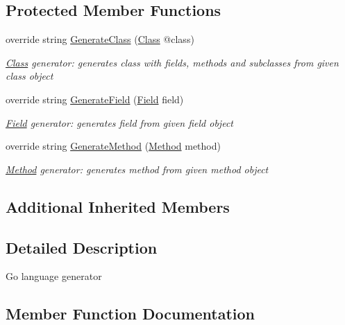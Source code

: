 \subsection*{Protected Member Functions}
\begin{DoxyCompactItemize}
\item 
override string \mbox{\hyperlink{classCodeGen_1_1generators_1_1GoGenerator_aacdb59f4942c999f06400f9f92732858}{Generate\+Class}} (\mbox{\hyperlink{classCodeGen_1_1generators_1_1Class}{Class}} @class)
\begin{DoxyCompactList}\small\item\em \mbox{\hyperlink{classCodeGen_1_1generators_1_1Class}{Class}} generator\+: generates class with fields, methods and subclasses from given class object  \end{DoxyCompactList}\item 
override string \mbox{\hyperlink{classCodeGen_1_1generators_1_1GoGenerator_aa7417b36b964e679a37dfee960148768}{Generate\+Field}} (\mbox{\hyperlink{classCodeGen_1_1generators_1_1Field}{Field}} field)
\begin{DoxyCompactList}\small\item\em \mbox{\hyperlink{classCodeGen_1_1generators_1_1Field}{Field}} generator\+: generates field from given field object  \end{DoxyCompactList}\item 
override string \mbox{\hyperlink{classCodeGen_1_1generators_1_1GoGenerator_ac732350d06454ed93f2053c0971c8fd9}{Generate\+Method}} (\mbox{\hyperlink{classCodeGen_1_1generators_1_1Method}{Method}} method)
\begin{DoxyCompactList}\small\item\em \mbox{\hyperlink{classCodeGen_1_1generators_1_1Method}{Method}} generator\+: generates method from given method object  \end{DoxyCompactList}\end{DoxyCompactItemize}
\subsection*{Additional Inherited Members}


\subsection{Detailed Description}
Go language generator 



\subsection{Member Function Documentation}
\mbox{\label{classCodeGen_1_1generators_1_1GoGenerator_aacdb59f4942c999f06400f9f92732858}} 
